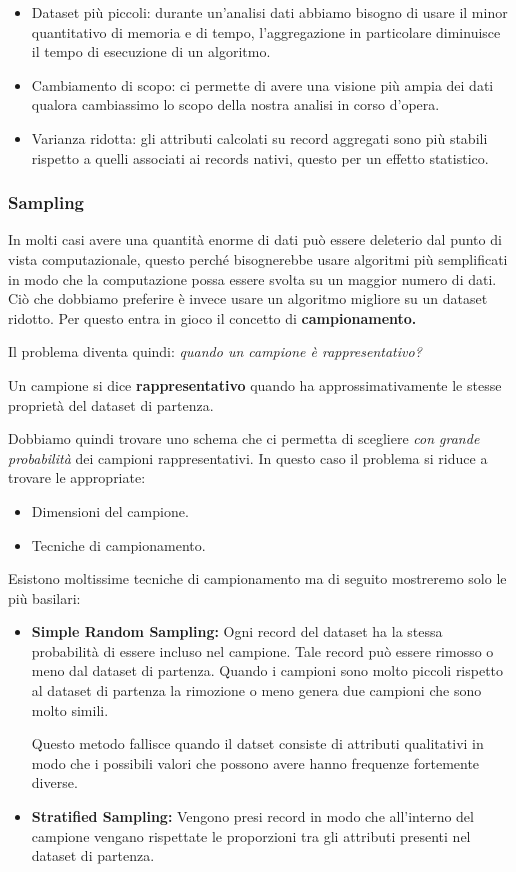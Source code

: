 \begin{itemize}
	\item Dataset più piccoli: durante un'analisi dati abbiamo bisogno di usare il minor quantitativo di memoria e di tempo, l'aggregazione in particolare diminuisce il tempo di esecuzione di un algoritmo.
	\item Cambiamento di scopo: ci permette di avere una visione più ampia dei dati qualora cambiassimo lo scopo della nostra analisi in corso d'opera.
	\item Varianza ridotta: gli attributi calcolati su record aggregati sono più stabili rispetto a quelli associati ai records nativi, questo per un effetto statistico.
\end{itemize}


\subsubsection{Sampling}
In molti casi avere una quantità enorme di dati può essere deleterio dal punto di vista computazionale, questo perché bisognerebbe usare algoritmi più semplificati in modo che la computazione possa essere svolta su un maggior numero di dati. Ciò che dobbiamo preferire è invece usare un algoritmo migliore su un dataset ridotto. Per questo entra in gioco il concetto di \textbf{campionamento.}

Il problema diventa quindi: \textit{quando un campione è rappresentativo?}

\begin{defn}
	Un campione si dice \textbf{rappresentativo} quando ha approssimativamente le stesse proprietà del dataset di partenza.

\end{defn}

Dobbiamo quindi trovare uno schema che ci permetta di scegliere \textit{con grande probabilità} dei campioni rappresentativi. In questo caso il problema si riduce a trovare le appropriate:
\begin{itemize}
	\item Dimensioni del campione.
	\item Tecniche di campionamento.
\end{itemize}
Esistono moltissime tecniche di campionamento ma di seguito  mostreremo solo le più basilari:

\begin{itemize}
	\item \textbf{Simple Random Sampling:} Ogni record del dataset ha la stessa probabilità di essere incluso nel campione. Tale record può essere rimosso o meno dal dataset di partenza. Quando i campioni sono molto piccoli rispetto al dataset di partenza la rimozione o meno genera due campioni che sono molto simili.
	
	Questo metodo fallisce quando il datset consiste di attributi qualitativi in modo che i possibili valori che possono avere hanno frequenze fortemente diverse.
	
	\item \textbf{Stratified Sampling:} Vengono presi record in modo che all'interno del campione vengano rispettate le proporzioni tra gli attributi presenti nel dataset di partenza.
\end{itemize}

